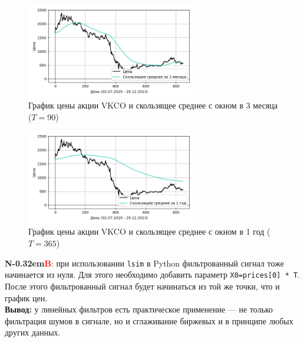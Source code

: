 \documentclass[a4paper]{article}
\newcommand\NB{\textbf{N\kern-0.32em\textcolor{red}{B}}}
\begin{document}
\begin{figure}[H]
    \centering \includegraphics[width=0.66\textwidth]{sources/third/moving_average_90.png}
    \caption{График цены акции VKCO и скользящее среднее с окном в 3 месяца ($T = 90$)}
\end{figure}\vspace{-1em}
\begin{figure}[H]
    \centering \includegraphics[width=0.66\textwidth]{sources/third/moving_average_365.png}
    \caption{График цены акции VKCO и скользящее среднее с окном в 1 год ($T = 365$)}
\end{figure}
\NB: при использовании \verb|lsim| в Python фильтрованный сигнал тоже начинается из нуля. Для этого необходимо добавить параметр \verb|X0=prices[0] * T|. После этого фильтрованный сигнал будет начинаться из той же точки, что и график цен.\\[0.5em]
\textbf{Вывод:} у линейных фильтров есть практическое применение --- не только фильтрация шумов в сигнале, но и сглаживание биржевых и в принципе любых других данных.
\end{document}
